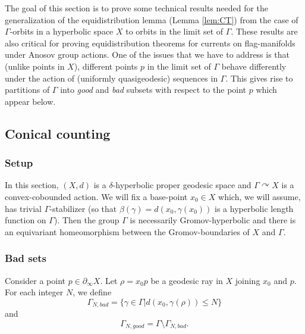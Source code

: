 \documentclass[12pt]{amsbook}%
\theoremstyle{definition}
\theoremstyle{remark}
\numberwithin{section}{chapter}
\numberwithin{subsection}{section}
\numberwithin{figure}{chapter}
\DeclareMathOperator{\acts}{\curvearrowright}
\def\Ga{\Gamma}
\def\ga{\gamma}
\def\geo{\partial_\infty}
\def\mini{\scriptsize}
\begin{document}
{{The goal of this section is to prove some technical results needed for the generalization of the equidistribution lemma (Lemma \ref{lem:CT}) from the case of $\Ga$-orbits  in a hyperbolic space $X$  to orbits in the limit set of $\Ga$. These results are also critical for proving equidistribution theorems for currents on flag-manifolds under Anosov group actions. 
One of the issues that we have to address is that (unlike points in $X$), different points $p$ in the limit set of $\Ga$ behave differently  under the action of (uniformly quasigeodesic) sequences in $\Ga$. This gives rise to partitions of $\Ga$ into {\em good} and {\em bad} subsets with respect to the point $p$ which appear below.  



\subsection{Conical counting} \label{section_conical}




\subsubsection{Setup}\label{sec:counting_setting}

In this section, $(X,d)$ is a $\delta$-hyperbolic {\mini proper} geodesic space and $\Ga\acts X$ is a  convex-cobounded action. 
We will fix a base-point $x_0\in X$ which, we will assume, has trivial $\Ga$-stabilizer (so that $\beta(\ga)=d(x_0, \ga(x_0))$ is a hyperbolic length function on $\Ga$). 
Then the group $\Ga$ is necessarily Gromov-hyperbolic and there is an equivariant homeomorphism between the 
Gromov-boundaries of $X$ and $\Ga$. 


\subsubsection{Bad sets}\label{sec:Counting}

Consider a point  $p\in \geo X$. 
Let $\rho=x_0p$ be a geodesic ray in $X$ joining $x_0$ and $p$. For each integer $N$, we define 
$$
\Gamma_{N, bad} = \{ \gamma \in \Gamma | d(x_0, \gamma(\rho)) \leqslant N \}$$   
and  
$$
\Gamma_{N, good} = \Gamma \setminus \Gamma_{N,bad}.$$ 

}}
\end{document}
